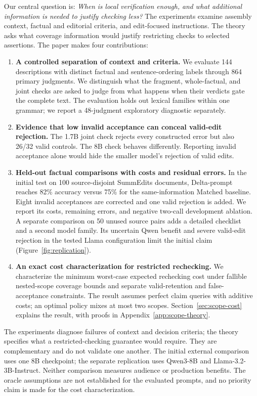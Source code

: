 \documentclass[10pt,letterpaper,twocolumn]{article}
\begin{document}
Our central question is: \emph{When is local verification enough, and what additional information is needed to justify checking less?} The experiments examine assembly context, factual and editorial criteria, and edit-focused instructions. The theory asks what coverage information would justify restricting checks to selected assertions. The paper makes four contributions:
\begin{enumerate}
\setlength{\itemsep}{2pt}\setlength{\parskip}{0pt}\setlength{\parsep}{0pt}
\item \textbf{A controlled separation of context and criteria.} We evaluate 144 descriptions with distinct factual and sentence-ordering labels through 864 primary judgments. We distinguish what the fragment, whole-factual, and joint checks are asked to judge from what happens when their verdicts gate the complete text. The evaluation holds out lexical families within one grammar; we report a 48-judgment exploratory diagnostic separately.
\item \textbf{Evidence that low invalid acceptance can conceal valid-edit rejection.} The 1.7B joint check rejects every constructed error but also 26/32 valid controls. The 8B check behaves differently. Reporting invalid acceptance alone would hide the smaller model's rejection of valid edits.
\item \textbf{Held-out factual comparisons with costs and residual errors.} In the initial test on 100 source-disjoint SummEdits documents, Delta-prompt reaches 82\% accuracy versus 75\% for the same-information Matched baseline. Eight invalid acceptances are corrected and one valid rejection is added. We report its costs, remaining errors, and negative two-call development ablation. A separate comparison on 50 unused source pairs adds a detailed checklist and a second model family. Its uncertain Qwen benefit and severe valid-edit rejection in the tested Llama configuration limit the initial claim (Figure~\ref{fig:replication}).
\item \textbf{An exact cost characterization for restricted rechecking.} We characterize the minimum worst-case expected rechecking cost under fallible nested-scope coverage bounds and separate valid-retention and false-acceptance constraints. The result assumes perfect claim queries with additive costs; an optimal policy mixes at most two scopes. Section~\ref{sec:scope-cost} explains the result, with proofs in Appendix~\ref{app:scope-theory}.
\end{enumerate}
The experiments diagnose failures of context and decision criteria; the theory specifies what a restricted-checking guarantee would require. They are complementary and do not validate one another. The initial external comparison uses one 8B checkpoint; the separate replication uses Qwen3-8B and Llama-3.2-3B-Instruct. Neither comparison measures audience or production benefits. The oracle assumptions are not established for the evaluated prompts, and no priority claim is made for the cost characterization.
\end{document}
